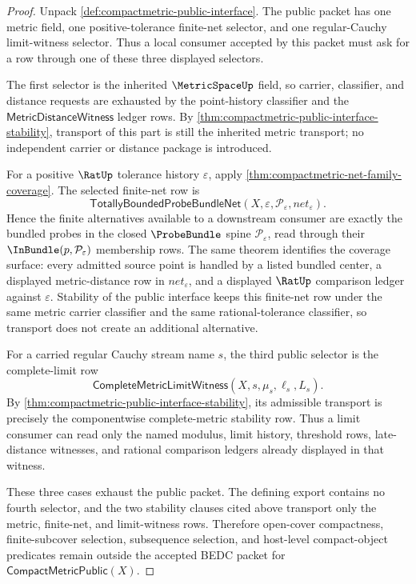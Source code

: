 \begin{proof}
Unpack \autoref{def:compactmetric-public-interface}. The public packet has one
metric field, one positive-tolerance finite-net selector, and one regular-Cauchy
limit-witness selector. Thus a local consumer accepted by this packet must ask
for a row through one of these three displayed selectors.

The first selector is the inherited $\MetricSpaceUp$ field, so carrier,
classifier, and distance requests are exhausted by the point-history classifier
and the $\mathsf{MetricDistanceWitness}$ ledger rows. By
\autoref{thm:compactmetric-public-interface-stability}, transport of this part
is still the inherited metric transport; no independent carrier or distance
package is introduced.

For a positive $\RatUp$ tolerance history $\varepsilon$, apply
\autoref{thm:compactmetric-net-family-coverage}. The selected finite-net row is
$$
\mathsf{TotallyBoundedProbeBundleNet}(X,\varepsilon,\mathcal{P}_{\varepsilon},net_{\varepsilon}).
$$
Hence the finite alternatives available to a downstream consumer are exactly
the bundled probes in the closed $\ProbeBundle$ spine
$\mathcal{P}_{\varepsilon}$, read through their
$\InBundle(p,\mathcal{P}_{\varepsilon})$ membership rows. The same theorem
identifies the coverage surface: every admitted source point is handled by a
listed bundled center, a displayed metric-distance row in $net_{\varepsilon}$,
and a displayed $\RatUp$ comparison ledger against $\varepsilon$. Stability of
the public interface keeps this finite-net row under the same metric carrier
classifier and the same rational-tolerance classifier, so transport does not
create an additional alternative.

For a carried regular Cauchy stream name $s$, the third public selector is the
complete-limit row
$$
\mathsf{CompleteMetricLimitWitness}(X,s,\mu_s,\ell_s,L_s).
$$
By \autoref{thm:compactmetric-public-interface-stability}, its admissible
transport is precisely the componentwise complete-metric stability row. Thus a
limit consumer can read only the named modulus, limit history, threshold rows,
late-distance witnesses, and rational comparison ledgers already displayed in
that witness.

These three cases exhaust the public packet. The defining export contains no
fourth selector, and the two stability clauses cited above transport only the
metric, finite-net, and limit-witness rows. Therefore open-cover compactness,
finite-subcover selection, subsequence selection, and host-level compact-object
predicates remain outside the accepted BEDC packet for
$\mathsf{CompactMetricPublic}(X)$.
\end{proof}
